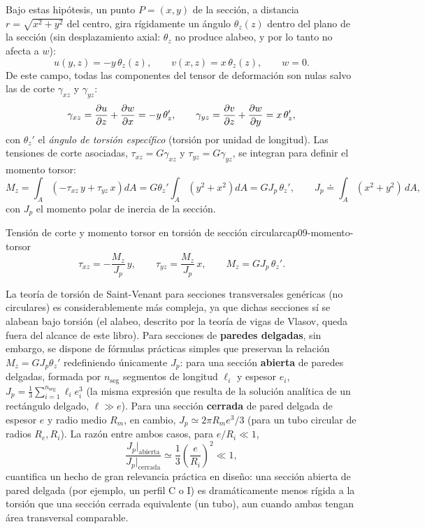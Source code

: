Bajo estas hipótesis, un punto $P=(x,y)$ de la sección, a distancia $r=\sqrt{x^2+y^2}$ del centro, gira rígidamente un ángulo $\theta_z(z)$ dentro del plano de la sección (sin desplazamiento axial: $\theta_z$ no produce alabeo, y por lo tanto no afecta a $w$):
\[
u(y,z) = -y\,\theta_z(z), \qquad v(x,z) = x\,\theta_z(z), \qquad w = 0 .
\]
De este campo, todas las componentes del tensor de deformación son nulas salvo las de corte $\gamma_{xz}$ y $\gamma_{yz}$:
\[
\gamma_{xz} = \pdv{u}{z}+\pdv{w}{x} = -y\,\theta_z', \qquad \gamma_{yz} = \pdv{v}{z}+\pdv{w}{y} = x\,\theta_z' ,
\]
con $\theta_z'$ el \emph{ángulo de torsión específico} (torsión por unidad de longitud). Las tensiones de corte asociadas, $\tau_{xz}=G\gamma_{xz}$ y $\tau_{yz}=G\gamma_{yz}$, se integran para definir el momento torsor:
\[
M_z = \int_A\left(-\tau_{xz}\,y+\tau_{yz}\,x\right)dA = G\theta_z'\int_A\left(y^2+x^2\right)dA = GJ_p\,\theta_z' , \qquad J_p\doteq\int_A(x^2+y^2)\,dA ,
\]
con $J_p$ el momento polar de inercia de la sección.

\begin{ecnimportante}{Tensión de corte y momento torsor en torsión de sección circular}{cap09-momento-torsor}
\[
\tau_{xz} = -\frac{M_z}{J_p}\,y , \qquad \tau_{yz} = \frac{M_z}{J_p}\,x , \qquad M_z = GJ_p\,\theta_z' .
\]
\end{ecnimportante}

\begin{observacion}
La teoría de torsión de Saint-Venant para secciones transversales genéricas (no circulares) es considerablemente más compleja, ya que dichas secciones sí se alabean bajo torsión (el alabeo, descrito por la teoría de vigas de Vlasov, queda fuera del alcance de este libro). Para secciones de \textbf{paredes delgadas}, sin embargo, se dispone de fórmulas prácticas simples que preservan la relación $M_z=GJ_p\theta_z'$ redefiniendo únicamente $J_p$: para una sección \textbf{abierta} de paredes delgadas, formada por $n_{\text{seg}}$ segmentos de longitud $\ell_i$ y espesor $e_i$, $J_p=\tfrac13\sum_{i=1}^{n_{\text{seg}}}\ell_i e_i^3$ (la misma expresión que resulta de la solución analítica de un rectángulo delgado, $\ell\gg e$). Para una sección \textbf{cerrada} de pared delgada de espesor $e$ y radio medio $R_m$, en cambio, $J_p\simeq2\pi R_m e^3/3$ (para un tubo circular de radios $R_e,R_i$). La razón entre ambos casos, para $e/R_i\ll1$,
\[
\frac{J_p\big|_{\text{abierta}}}{J_p\big|_{\text{cerrada}}} \simeq \frac13\left(\frac{e}{R_i}\right)^2 \ll 1 ,
\]
cuantifica un hecho de gran relevancia práctica en diseño: una sección abierta de pared delgada (por ejemplo, un perfil C o I) es dramáticamente menos rígida a la torsión que una sección cerrada equivalente (un tubo), aun cuando ambas tengan área transversal comparable.
\end{observacion}

